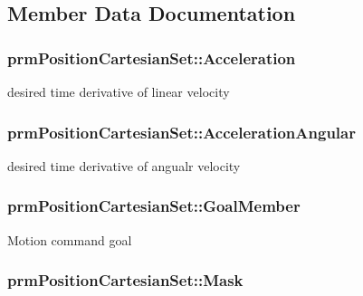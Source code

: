 \subsection{Member Data Documentation}
\hypertarget{classprm_position_cartesian_set_a6144a72c9905a29333b7943fabd93150}{
\subsubsection[{Acceleration}]{ prm\-Position\-Cartesian\-Set\-::\-Acceleration\hspace{0.3cm}{\ttfamily [protected]}}}\label{classprm_position_cartesian_set_a6144a72c9905a29333b7943fabd93150}
desired time derivative of linear velocity \hypertarget{classprm_position_cartesian_set_a0c8c1b02ab4feb3961921d7ce49f1657}{
\subsubsection[{Acceleration\-Angular}]{ prm\-Position\-Cartesian\-Set\-::\-Acceleration\-Angular\hspace{0.3cm}{\ttfamily [protected]}}}\label{classprm_position_cartesian_set_a0c8c1b02ab4feb3961921d7ce49f1657}
desired time derivative of angualr velocity \hypertarget{classprm_position_cartesian_set_afa8b6da3bc44612f35332ad2c8d09bc1}{
\subsubsection[{Goal\-Member}]{ prm\-Position\-Cartesian\-Set\-::\-Goal\-Member\hspace{0.3cm}{\ttfamily [protected]}}}\label{classprm_position_cartesian_set_afa8b6da3bc44612f35332ad2c8d09bc1}
Motion command goal \hypertarget{classprm_position_cartesian_set_aa9dcc7db15cd8fc1417d0db5ddc0aec7}{
\subsubsection[{Mask}]{ prm\-Position\-Cartesian\-Set\-::\-Mask\hspace{0.3cm}{\ttfamily [protected]}}}\label{classprm_position_cartesian_set_aa9dcc7db15cd8fc1417d0db5ddc0aec7}
